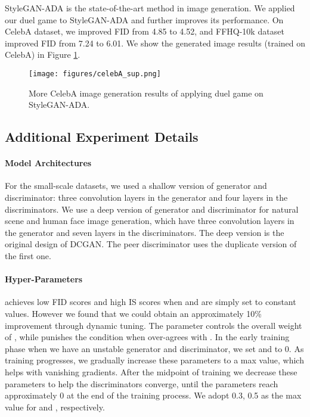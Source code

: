 StyleGAN-ADA \cite{karras2020training} is the state-of-the-art method in image generation. We applied our duel game to StyleGAN-ADA and further improves its performance. On CelebA \cite{CelebA} dataset, we improved FID from 4.85 to 4.52, and FFHQ-10k\cite{karras2019style} dataset improved FID from 7.24 to 6.01. We show the generated image results (trained on CelebA) in Figure \ref{Fig:celebA_sup}.
 \begin{figure}
 \vspace{-0.1in}
    \centering
    {\texttt{[image: figures/celebA\_sup.png]}
    }
 \vspace{-0.15in}
    \caption{More CelebA image generation results of applying duel game on StyleGAN-ADA.}
 \vspace{-0.15in}
    \label{Fig:celebA_sup}
\end{figure}

\subsection{Additional Experiment Details}

\paragraph{Model Architectures}

For the small-scale datasets, we used a shallow version of generator and discriminator: three convolution layers in the generator and four layers in the
discriminators. We use a deep version of generator and discriminator for natural
scene and human face image generation, which have three convolution layers in
the generator and seven layers in the discriminators. The deep version is the
original design of DCGAN\cite{DCGAN}. The peer discriminator uses the duplicate version of the first one.


\paragraph{Hyper-Parameters}\label{app:para} 
 
\PG{} achieves low FID scores and high IS scores when  and  are simply set to constant values. However we found that we could obtain an approximately 10\% improvement through dynamic tuning. The parameter  controls the overall weight of , while  punishes the condition when  over-agrees with . In the early training phase when we have an unstable generator and discriminator, we set  and  to 0. As training progresses, we gradually increase these parameters to a max value, which helps with vanishing gradients. After the midpoint of training we decrease these parameters to help the discriminators converge, until the parameters reach approximately 0 at the end of the training process. We adopt 0.3, 0.5 as the max value for  and , respectively.

